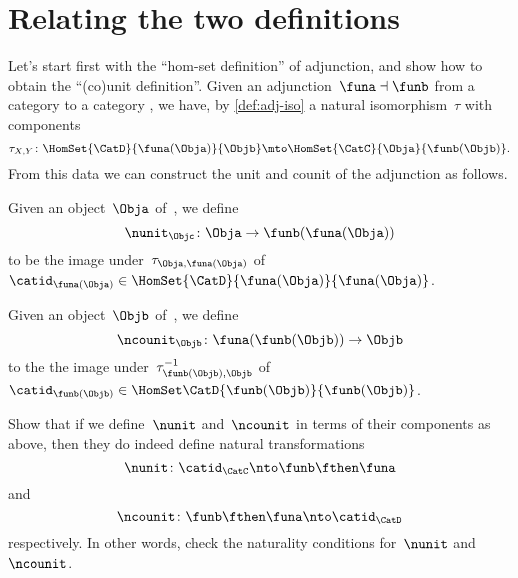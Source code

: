 
\section{Relating the two definitions}
\label{relate-adj-defs}

Let's start first with the ``hom-set definition'' of adjunction, and show how to obtain the ``(co)unit definition''.
Given an adjunction~$\funa \dashv \funb$ from a category \CatC to a category \CatD, we have, by \cref{def:adj-iso} a natural isomorphism~$\tau$ with components
\begin{equation*}
    \tau_{X,Y} \colon \HomSet{\CatD}{\funa(\Obja)}{\Objb} \mto \HomSet{\CatC}{\Obja}{\funb(\Objb)}.
\end{equation*}
From this data we can construct the unit and counit of the adjunction as follows.

Given an object~$\Obja$ of~\CatC, we define
\begin{equation*}
    \nunit_\Objc \colon \Obja \to \funb(\funa(\Obja))
\end{equation*}
to be the image under~$\tau_{\Obja, \funa(\Obja)}$ of~$\catid_{\funa(\Obja)} \in \HomSet{\CatD}{\funa (\Obja)}{\funa(\Obja)}$.

Given an object~$\Objb$ of~\CatD, we define
\begin{equation*}
    \ncounit_\Objb \colon \funa(\funb(\Objb)) \to \Objb
\end{equation*}
to the the image under~$\tau_{\funb(\Objb), \Objb}^{-1}$ of~$\catid_{\funb(\Objb)} \in \HomSet\CatD{\funb(\Objb)}{\funb(\Objb)}$.

\begin{exercise}
    \label{ex:eta-epsilon}

    Show that if we define~$\nunit$ and~$\ncounit$ in terms of their components as above, then they do indeed define natural transformations
    \begin{equation*}
        \nunit\colon \catid_{\CatC} \nto \funb\fthen \funa
    \end{equation*}
    and
    \begin{equation*}
        \ncounit\colon \funb \fthen \funa \nto \catid_{\CatD}
    \end{equation*}
    respectively.
    In other words, check the naturality conditions for~$\nunit$ and~$\ncounit$.
\end{exercise}
\begin{solution}
    \missingsolution
\end{solution}

